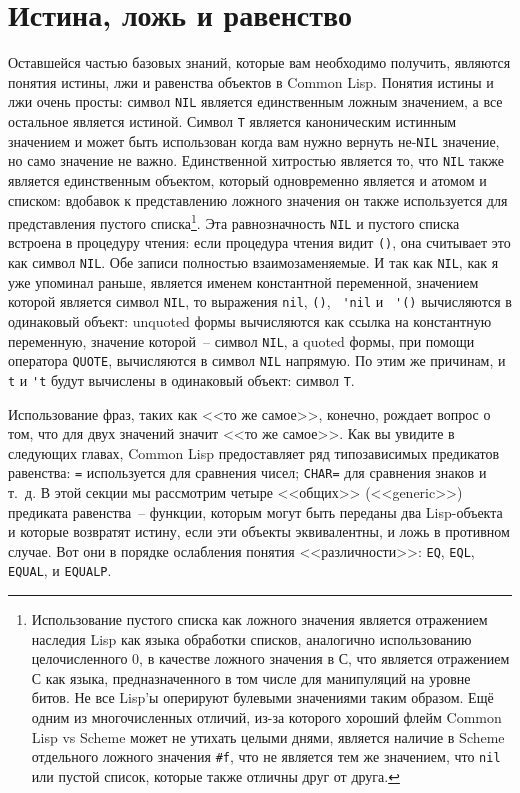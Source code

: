 \section{Истина, ложь и равенство}

Оставшейся частью базовых знаний, которые вам необходимо получить, являются понятия
истины, лжи и равенства объектов в Common Lisp. Понятия истины и лжи очень просты: символ
\lstinline{NIL} является единственным ложным значением, а все остальное является
истиной. Символ \lstinline{T} является каноническим истинным значением и может быть
использован когда вам нужно вернуть не-\lstinline{NIL} значение, но само значение не
важно. Единственной хитростью является то, что \lstinline{NIL} также является единственным
объектом, который одновременно является и атомом и списком: вдобавок к представлению
ложного значения он также используется для представления пустого
списка\footnote{Использование пустого списка как ложного значения является отражением
  наследия Lisp как языка обработки списков, аналогично использованию целочисленного 0, в
  качестве ложного значения в С, что является отражением С как языка, предназначенного в
  том числе для манипуляций на уровне битов. Не все Lisp'ы оперируют булевыми значениями
  таким образом. Ещё одним из многочисленных отличий, из-за которого хороший флейм Common
  Lisp vs Scheme может не утихать целыми днями, является наличие в Scheme отдельного
  ложного значения \lstinline{#f}, что не является тем же значением, что \lstinline{nil} или пустой
  список, которые также отличны друг от друга.}. Эта равнозначность \lstinline{NIL} и пустого
списка встроена в процедуру чтения: если процедура чтения видит \lstinline{()}, она считывает
это как символ \lstinline{NIL}. Обе записи полностью взаимозаменяемые. И так как
\lstinline{NIL}, как я уже упоминал раньше, является именем константной переменной, значением
которой является символ \lstinline{NIL}, то выражения \lstinline{nil}, \lstinline{()}, \lstinline{ 'nil} и
\lstinline{ '()} вычисляются в одинаковый объект: unquoted формы вычисляются как ссылка на
константную переменную, значение которой~-- символ \lstinline{NIL}, а quoted формы, при
помощи оператора \lstinline{QUOTE}, вычисляются в символ \lstinline{NIL} напрямую. По этим же
причинам, и \lstinline{t} и \lstinline{'t} будут вычислены в одинаковый объект: символ \lstinline{T}.

Использование фраз, таких как <<то же самое>>, конечно, рождает вопрос о том, что для двух
значений значит <<то же самое>>. Как вы увидите в следующих главах, Common Lisp
предоставляет ряд типозависимых предикатов равенства: \lstinline{=} используется для сравнения
чисел; \lstinline{CHAR=} для сравнения знаков и т.~д. В этой секции мы рассмотрим четыре <<общих>>
(<<generic>>) предиката равенства~-- функции, которым могут быть переданы два Lisp-объекта
и которые возвратят истину, если эти объекты эквивалентны, и ложь в противном случае. Вот
они в порядке ослабления понятия <<различности>>: \lstinline{EQ}, \lstinline{EQL}, \lstinline{EQUAL},
и \lstinline{EQUALP}.

